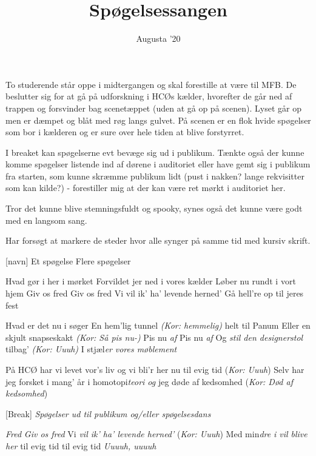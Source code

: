 \documentclass[a4paper, 11pt]{article}
\title{Spøgelsessangen}
\author{Augusta '20}
\begin{document}
\maketitle 

\scene To studerende står oppe i midtergangen og skal forestille at være til MFB. De beslutter sig for at gå på udforskning i HCØs kælder, hvorefter de går ned af trappen og forsvinder bag scenetæppet (uden at gå op på scenen). Lyset går op men er dæmpet og blåt med røg langs gulvet. På scenen er en flok hvide spøgelser som bor i kælderen og er sure over hele tiden at blive forstyrret. 

\scene I breaket kan spøgelserne evt bevæge sig ud i publikum. Tænkte også der kunne komme spøgelser listende ind af dørene i auditoriet eller have gemt sig i publikum fra starten, som kunne skræmme publikum lidt (pust i nakken? lange rekvisitter som kan kilde?) - forestiller mig at der kan være ret mørkt i auditoriet her.

\scene Tror det kunne blive stemningsfuldt og spooky, synes også det kunne være godt med en langsom sang.

\scene Har forsøgt at markere de steder hvor alle synger på samme tid med kursiv skrift. 

\begin{roles}  
[navn] Et spøgelse
 Flere spøgelser

\end{roles}

\begin{song}


Hvad gør i her i mørket 
Forvildet jer ned i vores kælder 
Løber nu rundt i vort hjem 
Giv os fred  
Giv os fred 
Vi vil ik' ha' levende herned'
Gå hell're
op til jeres fest


Hvad er det nu i søger
En hem'lig tunnel \textit{(Kor: hemmelig)} helt til Panum 
Eller en skjult snapseskakt \textit{(Kor: Så pis nu-)}
Pis nu \textit{af} 
Pis nu \textit{af}  
Og \textit{stil den designerstol} tilbag' 
\textit{(Kor: Uuuh)} I stjæl\textit{er} 
\textit{vores møblement}

På HCØ har vi levet vor's liv og  
vi bli'r her nu til evig tid
(\textit{Kor: Uuuh}) Selv har jeg forsket  
i mang' år i homotopi\textit{teori og}
jeg døde af kedsomhed (\textit{Kor: Død af kedsomhed})

\sings{}[Break]
\textit{Spøgelser ud til publikum og/eller spøgelsesdans}

\textit{Fred} 
\textit{Giv os fred} 
Vi \textit{vil ik' ha' levende herned'} 
(\textit{Kor: Uuuh}) Med min\textit{dre}
\textit{i vil blive her}
til evig tid
til evig tid 
\textit{Uuuuh, uuuuh }



\end{song}
\end{document}
